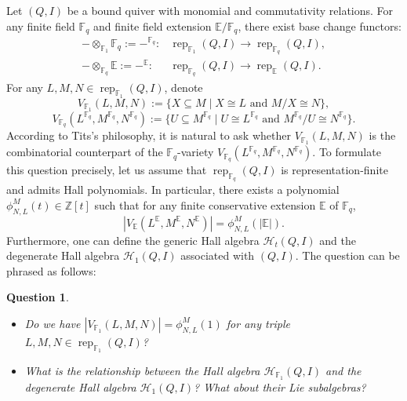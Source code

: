 \documentclass[12pt]{amsart}
\newtheorem{question}[thm]{Question}
\theoremstyle{remark}
\theoremstyle{definition}
\numberwithin{equation}{section}
\begin{document}
Let $(Q,I)$ be a bound quiver with monomial and commutativity relations. For any finite field $\mathbb{F}_q$ and finite field extension $\mathbb{E}/\mathbb{F}_q$, there exist base change functors:
\begin{align*}
    -\otimes_{\mathbb{F}_1}\mathbb{F}_q:=-^{\mathbb{F}_q}:&\operatorname{rep}_{\mathbb{F}_1}(Q,I)\to \operatorname{rep}_{\mathbb{F}_q}(Q,I),\\
    -\otimes_{\mathbb{F}_q}\mathbb{E}:=-^{\mathbb{E}}:&\operatorname{rep}_{\mathbb{F}_q}(Q,I)\to \operatorname{rep}_{\mathbb{E}}(Q,I).
\end{align*}
For any $L,M,N\in \operatorname{rep}_{\mathbb{F}_1}(Q,I)$, denote
\[V_{\mathbb{F}_1}(L,M,N):=\{X\subseteq M\mid  X\cong L \text{ and } M/X\cong N \},\] 
\[V_{\mathbb{F}_q}(L^{\mathbb{F}_q},M^{\mathbb{F}_q},N^{\mathbb{F}_q}):=\{U\subseteq M^{\mathbb{F}_q}\mid U\cong L^{\mathbb{F}_q} \text{ and } M^{\mathbb{F}_q}/U\cong N^{\mathbb{F}_q} \}.\] 
According to Tits's philosophy, it is natural to ask whether $V_{\mathbb{F}_1}(L,M,N)$ is the combinatorial counterpart of the $\mathbb{F}_q$-variety $V_{\mathbb{F}_q}(L^{\mathbb{F}_q},M^{\mathbb{F}_q},N^{\mathbb{F}_q})$.
To formulate this question precisely, let us assume that $\operatorname{rep}_{\mathbb{F}_q}(Q,I)$ is representation-finite and admits Hall polynomials. In particular, there exists a polynomial $\phi_{N,L}^M(t)\in \mathbb{Z}[t]$ such that for any finite conservative extension $\mathbb{E}$ of $\mathbb{F}_q$, \[|V_\mathbb{E}(L^\mathbb{E},M^\mathbb{E},N^\mathbb{E})|=\phi_{N,L}^M(|\mathbb{E}|).\]
Furthermore, one can define the generic Hall algebra $\mathcal{H}_t(Q,I)$ and the degenerate Hall algebra $\mathcal{H}_1(Q,I)$ associated with $(Q,I)$.
The question can be phrased as follows:
\begin{question}\label{ques:tits-philosophy}
    \begin{itemize}
        \item[(1)] Do we have $|V_{\mathbb{F}_1}(L,M,N)|=\phi_{N,L}^M(1)$ for any triple $L,M,N\in \operatorname{rep}_{\mathbb{F}_1}(Q,I)$?
        \item[(2)] What is the relationship between the Hall algebra $\mathcal{H}_{\mathbb{F}_1}(Q,I)$ and the degenerate Hall algebra $\mathcal{H}_1(Q,I)$? What about their Lie subalgebras?
    \end{itemize}
\end{question}
\end{document}
